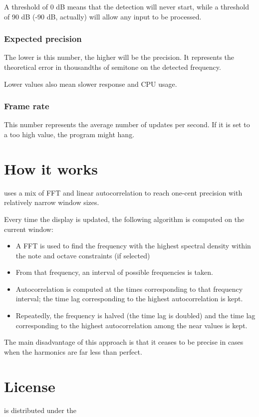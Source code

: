 A threshold of 0 dB means that the detection will never start, while a threshold
of 90 dB (-90 dB, actually) will allow any input to be processed.

\subsection{Expected precision}\label{expectedprecision}

The lower is this number, the higher will be the precision. It represents the
theoretical error in thousandths of semitone on the detected frequency.

Lower values also mean slower response and CPU usage.

\subsection{Frame rate}\label{framerate}

This number represents the average number of updates per second. If it is set to 
a too high value, the program might hang.

\chapter{How it works}\label{howitworks}

 uses a mix of FFT and linear autocorrelation to reach one-cent precision with relatively narrow window sizes.

Every time the display is updated, the following algorithm is computed on the current window:

\begin{itemize}
  \item A FFT is used to find the frequency with the highest spectral density within the note and octave constraints (if selected)
  \item From that frequency, an interval of possible frequencies is taken.
  \item Autocorrelation is computed at the times corresponding to that frequency interval; the time lag corresponding to the highest autocorrelation is kept.
  \item Repeatedly, the frequency is halved (the time lag is doubled) and the time lag corresponding to the highest autocorrelation among the near values is kept.
\end{itemize}

The main disadvantage of this approach is that it ceases to be precise in cases when the harmonics are far less than perfect.

\appendix

\chapter{License}\label{license}

 is distributed under the 




